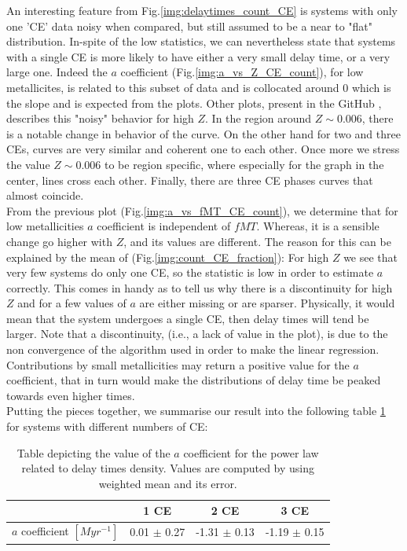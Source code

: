\documentclass[preprint,12pt]{elsarticle}
\begin{document}
An interesting feature from Fig.\ref{img:delaytimes_count_CE} is systems with only one 'CE' data noisy when compared, but still assumed to be a near to "flat" distribution. In-spite of the low statistics, we can nevertheless state that systems with a single CE is more likely to have either a very small delay time, or a very large one. Indeed the $a$ coefficient (Fig.\ref{img:a_vs_Z_CE_count}), for low metallicites, is related to this subset of data and is collocated around 0 which is the slope and is expected from the plots. Other plots, present in the GitHub \citep{github}, describes this "noisy" behavior for high $Z$. In the region around $Z \sim 0.006$, there is a notable change in behavior of the curve. On the other hand for two and three CEs, curves are very similar and coherent one to each other. Once more we stress the value $Z \sim 0.006$ to be region specific, where especially for the graph in the center, lines cross each other. Finally, there are three CE phases curves that almost coincide.\\

From the previous plot (Fig.\ref{img:a_vs_fMT_CE_count}), we determine that for low metallicities $a$ coefficient is independent of $fMT$. Whereas, it is a sensible change go higher with $Z$, and its values are different. The reason for this can be explained by the mean of (Fig.\ref{img:count_CE_fraction}): For high $Z$ we see that very few systems do only one CE, so the statistic is low in order to estimate $a$ correctly. This comes in handy as to tell us why there is a discontinuity for high $Z$ and for a few values of $a$ are either missing or are sparser. Physically, it would mean that the system undergoes a single CE, then delay times will tend be larger. Note that a discontinuity, (i.e., a lack of value in the plot), is due to the non convergence of the algorithm used in order to make the linear regression. Contributions by small metallicities may return a positive value for the $a$ coefficient, that in turn would make the distributions of delay time be peaked towards even higher times.\\
Putting the pieces together, we summarise our result into the following table \ref{table:a_coefficient} for systems with different numbers of CE:

\begin{table}[h!]
\centering
\begin{tabular}{||c c c c||} 
 \hline
   & \textbf{1 CE} & \textbf{2 CE} & \textbf{3 CE}  \\ [0.5ex] 
 \hline\hline
 $a$ coefficient \footnotesize{ $[Myr^{-1}]$ } &  0.01 $\pm$ 0.27 & -1.31 $\pm$ 0.13 & -1.19 $\pm$ 0.15\\
 \hline
\end{tabular}
\caption{Table depicting the value of the $a$ coefficient for the power law related to delay times density. Values are computed by using weighted mean and its error.}
\label{table:a_coefficient}
\end{table}
\end{document}
